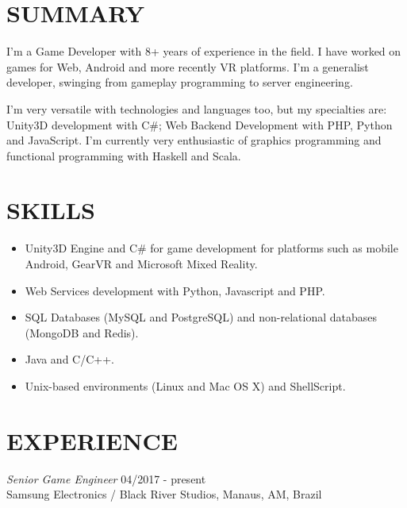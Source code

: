 \documentclass[line,margin]{res}
\begin{document}

\address{Rua Prof. Virginio Marques, 201, Bloco F, Res. Eliza Miranda - Manaus, AM - Brazil}
\address{+55 11 999326440 - bruno@croci.me - \href{http://bruno.croci.me/}{http://bruno.croci.me/}}

 
\begin{resume}
 
\section{SUMMARY} I'm a Game Developer with 8+ years of experience in the field. I have worked on games for Web, Android and more recently VR platforms. I'm a generalist developer, swinging from gameplay programming to server engineering.

I'm very versatile with technologies and languages too, but my specialties are: Unity3D development with C\#; Web Backend Development with PHP, Python and JavaScript. I'm currently very enthusiastic of graphics programming and functional programming with Haskell and Scala.
 
\section{SKILLS} \begin{itemize}  \itemsep 1.25pt
				 \item Unity3D Engine and C\# for game development for platforms such as mobile Android, GearVR and Microsoft Mixed Reality.
				 \item Web Services development with Python, Javascript and PHP.
				 \item SQL Databases (MySQL and PostgreSQL) and non-relational databases (MongoDB and Redis).
                 \item Java and C/C++.
                 \item Unix-based environments (Linux and Mac OS X) and ShellScript.
                 \end{itemize}
 
\section{EXPERIENCE} {\sl Senior Game Engineer} \hfill 04/2017 - present \\
                Samsung Electronics / Black River Studios, Manaus, AM, Brazil


\end{resume}
\end{document}
